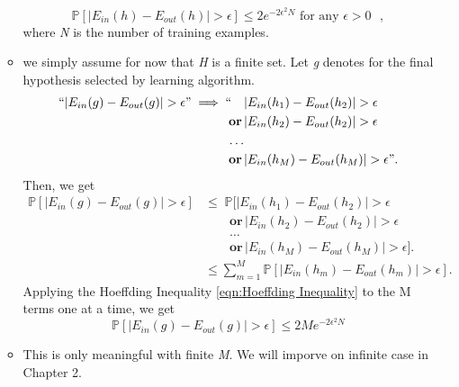 \documentclass[11pt]{article}
\theoremstyle{definition}
\numberwithin{equation}{section}
\begin{document}
\begin{itemize}[noitemsep, topsep=0pt]
\begin{itemize}[noitemsep, topsep=0pt]
            \begin{equation}
                \mathbb{P}[|E_{in}(h) - E_{out}(h)| > \epsilon] \leq 2e^{-2\epsilon^2N} \text{ for any $\epsilon > 0$ },
            \end{equation}
            where \textit{N} is the number of training examples.
        \item we simply assume for now that \textit{H} is a finite set. Let \textit{g} denotes for the final hypothesis selected by learning algorithm.
            \begin{equation}
            \begin{aligned}
                ``|E_{in}(g) - E_{out}(g)| > \epsilon " \implies `` \quad & |E_{in}(h_1) - E_{out}(h_2)| > \epsilon \\
                \mathbf{or} \, & |E_{in}(h_2) - E_{out}(h_2)| > \epsilon \\
                \ldots \\
                \mathbf{or} \, & |E_{in}(h_M) - E_{out}(h_M)| > \epsilon".
            \end{aligned}
            \end{equation}
            Then, we get
            \begin{equation}
            \begin{aligned}
                \mathbb{P}[|E_{in}(g) - E_{out}(g)| > \epsilon] & \leq \; \mathbb{P} [ |E_{in}(h_1) - E_{out}(h_2)| > \epsilon \\ 
                & \qquad \mathbf{or} \, |E_{in}(h_2) - E_{out}(h_2)| > \epsilon \\
                & \qquad \ldots \\
                & \qquad \mathbf{or} \, |E_{in}(h_M) - E_{out}(h_M)| > \epsilon ]. \\
                & \leq \sum_{m=1}^{M} \mathbb{P}[|E_{in}(h_m) - E_{out}(h_m)| > \epsilon].
            \end{aligned}
            \end{equation}
            Applying the Hoeffding Inequality \ref{eqn:Hoeffding Inequality} to the M terms one at a time, we get
            \begin{equation}
                \mathbb{P}[|E_{in}(g) - E_{out}(g)| > \epsilon] \leq 2Me^{-2\epsilon^2N}
            \end{equation}
        \item This is only meaningful with finite \textit{M}. We will imporve on infinite case in Chapter 2.

    \end{itemize}
\end{itemize}
\end{document}
